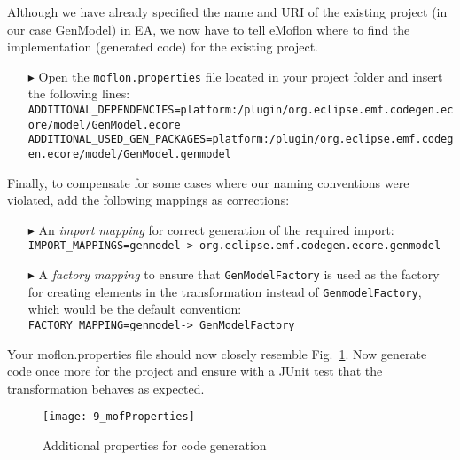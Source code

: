 Although we have already specified the name and URI of the existing project (in our case \textsf{GenModel}) in EA, we now have to tell eMoflon where to find the
implementation (generated code) for the existing project.
\begin{enumerate}
\item[$\blacktriangleright$] Open the \texttt{moflon.properties} file located in your project folder and insert the following lines:\\
\texttt{{\tiny ADDITIONAL\_DEPENDENCIES=platform:/plugin/org.eclipse.emf.codegen.ecore/model/GenModel.ecore}}\\
\texttt{{\tiny ADDITIONAL\_USED\_GEN\_PACKAGES=platform:/plugin/org.eclipse.emf.codegen.ecore/model/GenModel.genmodel}}
\end{enumerate}

Finally, to compensate for some cases where our naming conventions were violated, add the following mappings as corrections:

\begin{enumerate}
\item[$\blacktriangleright$] An \emph{import mapping} for correct generation of the required import:\\
\texttt{\tiny IMPORT\_MAPPINGS=genmodel-> org.eclipse.emf.codegen.ecore.genmodel}

\item [$\blacktriangleright$] A \emph{factory mapping} to ensure that \texttt{GenModelFactory} is used as the factory for creating elements in the
transformation instead of \texttt{Genmodel\-Factory}, which would be the default convention:\\
\texttt{\tiny FACTORY\_MAPPING=genmodel-> GenModelFactory}
\end{enumerate}

Your \textsf{moflon.properties} file should now closely resemble Fig.~\ref{fig_mofProp}. Now generate code once more for the project and ensure with a JUnit
test that the transformation behaves as expected.

\begin{figure}[htbp]
\begin{center}  \texttt{[image: 9\_mofProperties]}
  \caption{Additional properties for code generation}  
  \label{fig_mofProp}
\end{center}
\end{figure} 
